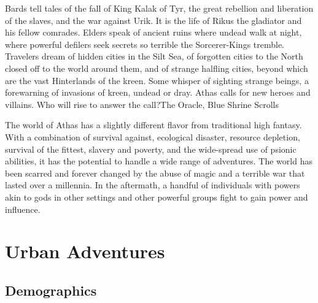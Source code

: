 {Bards tell tales of the fall of King Kalak of Tyr, the great rebellion and liberation of the slaves, and the war against Urik. It is the life of Rikus the gladiator and his fellow comrades. Elders speak of ancient ruins where undead walk at night, where powerful defilers seek secrets so terrible the Sorcerer-Kings tremble. Travelers dream of hidden cities in the Silt Sea, of forgotten cities to the North closed off to the world around them, and of strange halfling cities, beyond which are the vast Hinterlands of the kreen. Some whisper of sighting strange beings, a forewarning of invasions of kreen, undead or dray. Athas calls for new heroes and villains. Who will rise to answer the call?}{The Oracle, Blue Shrine Scrolls}

The world of Athas has a slightly different flavor from traditional high fantasy. With a combination of survival against, ecological disaster, resource depletion, survival of the fittest, slavery and poverty, and the wide-spread use of psionic abilities, it has the potential to handle a wide range of adventures. The world has been scarred and forever changed by the abuse of magic and a terrible war that lasted over a millennia. In the aftermath, a handful of individuals with powers akin to gods in other settings and other powerful groups fight to gain power and influence.

\section{Urban Adventures}
\subsection{Demographics}


